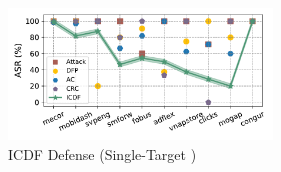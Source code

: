 \begin{figure}[h!]
	\centering
	\includegraphics[keepaspectratio,height=3.5cm]{Graph/Evaluation/Figure-last.pdf}
	\caption{ICDF Defense (Single-Target \pandora)}
	\label{fig:APIGraph-targeted-defense}
\end{figure}
